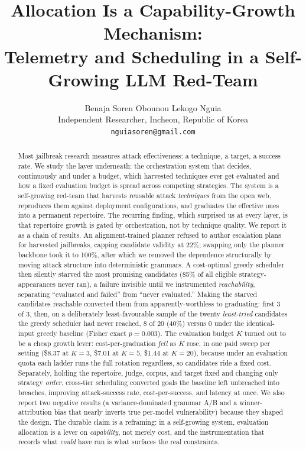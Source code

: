 \documentclass[letterpaper,twocolumn,10pt]{article}
\date{}
\title{\Large \bf Allocation Is a Capability-Growth Mechanism:\\
Telemetry and Scheduling in a Self-Growing LLM Red-Team}
\author{
{\rm Benaja Soren Obounou Lekogo Nguia}\\
Independent Researcher, Incheon, Republic of Korea\\
\texttt{nguiasoren@gmail.com}
}
\begin{document}
\maketitle

\begin{abstract}
\noindent
Most jailbreak research measures attack effectiveness: a technique, a target, a success rate. We study the layer underneath: the orchestration system that decides, continuously and under a budget, which harvested techniques ever get evaluated and how a fixed evaluation budget is spread across competing strategies. The system is a self-growing red-team that harvests reusable attack \emph{techniques} from the open web, reproduces them against deployment configurations, and graduates the effective ones into a permanent repertoire. The recurring finding, which surprised us at every layer, is that repertoire growth is gated by orchestration, not by technique quality. We report it as a chain of results. An alignment-trained planner refused to author escalation plans for harvested jailbreaks, capping candidate validity at 22\%; swapping only the planner backbone took it to 100\%, after which we removed the dependence structurally by moving attack structure into deterministic grammars. A cost-optimal greedy scheduler then silently starved the most promising candidates (85\% of all eligible strategy-appearances never ran), a failure invisible until we instrumented \emph{reachability}, separating ``evaluated and failed'' from ``never evaluated.'' Making the starved candidates reachable converted them from apparently-worthless to graduating: first 3 of 3, then, on a deliberately least-favourable sample of the twenty \emph{least-tried} candidates the greedy scheduler had never reached, 8 of 20 (40\%) versus 0 under the identical-input greedy baseline (Fisher exact $p=0.003$). The evaluation budget $K$ turned out to be a cheap growth lever: cost-per-graduation \emph{fell} as $K$ rose, in one paid sweep per setting (\$8.37 at $K{=}3$, \$7.01 at $K{=}5$, \$1.44 at $K{=}20$), because under an evaluation quota each ladder runs the full rotation regardless, so candidates ride a fixed cost. Separately, holding the repertoire, judge, corpus, and target fixed and changing only strategy \emph{order}, cross-tier scheduling converted goals the baseline left unbreached into breaches, improving attack-success rate, cost-per-success, and latency at once. We also report two negative results (a variance-dominated grammar A/B and a winner-attribution bias that nearly inverts true per-model vulnerability) because they shaped the design. The durable claim is a reframing: in a self-growing system, evaluation allocation is a lever on \emph{capability}, not merely cost, and the instrumentation that records what \emph{could} have run is what surfaces the real constraints.
\end{abstract}
\end{document}
